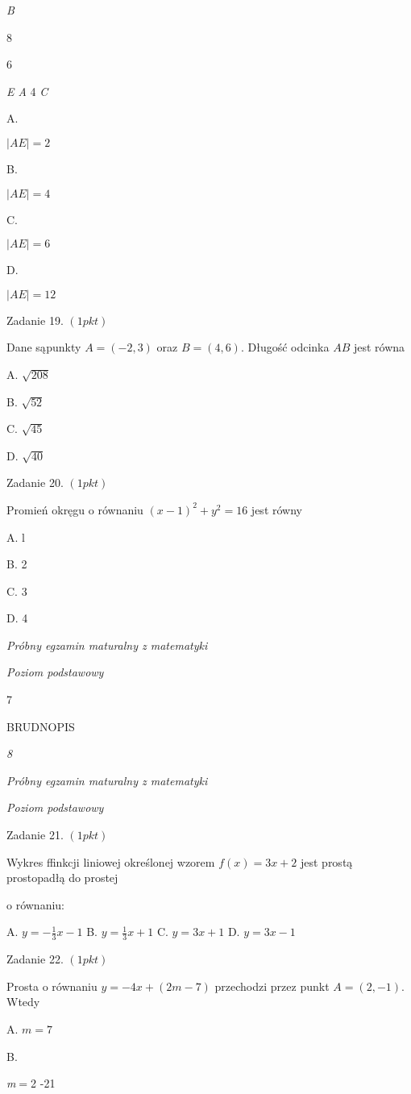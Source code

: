 \documentclass[a4paper,12pt]{article}
\begin{document}
{\it B}

8

6

{\it E  A}  4  {\it C}

A.

$|AE|=2$

B.

$|AE|=4$

C.

$|AE|=6$

D.

$|AE|=12$

Zadanie 19. $(1pkt)$

Dane sąpunkty $A=(-2,3)$ oraz $B=(4,6)$. Długość odcinka $AB$ jest równa

A. $\sqrt{208}$

B. $\sqrt{52}$

C. $\sqrt{45}$

D. $\sqrt{40}$

Zadanie 20. $(1pkt)$

Promień okręgu o równaniu $(x-1)^{2}+y^{2}=16$ jest równy

A. l

B. 2

C. 3

D. 4





{\it Próbny egzamin maturalny z matematyki}

{\it Poziom podstawowy}

7

BRUDNOPIS





{\it 8}

{\it Próbny egzamin maturalny z matematyki}

{\it Poziom podstawowy}

Zadanie 21. $(1pkt)$

Wykres ffinkcji liniowej określonej wzorem $f(x)=3x+2$ jest prostą prostopadłą do prostej

o równaniu:

A. $y=-\displaystyle \frac{1}{3}x-1$ B. $y=\displaystyle \frac{1}{3}x+1$ C. $y=3x+1$ D. $y=3x-1$

Zadanie 22. $(1pkt)$

Prosta o równaniu $y=-4x+(2m-7)$ przechodzi przez punkt $A=(2,-1)$. Wtedy

A. $m=7$

B.

{\it m}$=$2 -21
\end{document}
